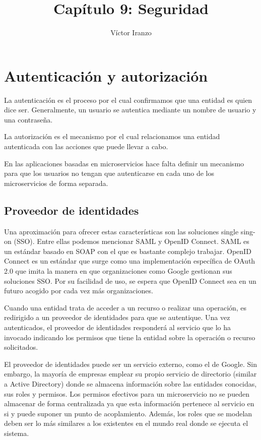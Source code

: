 \documentclass[11pt,a4paper]{article}
\author{Víctor Iranzo}
\title{Capítulo 9: Seguridad}
\begin{document}
\maketitle

\section{Autenticación y autorización}

La autenticación es el proceso por el cual confirmamos que una entidad es quien dice ser. Generalmente, un usuario se autentica mediante un nombre de usuario y una contraseña.

La autorización es el mecanismo por el cual relacionamos una entidad autenticada con las acciones que puede llevar a cabo.

En las aplicaciones basadas en microservicios hace falta definir un mecanismo para que los usuarios no tengan que autenticarse en cada uno de los microservicios de forma separada.

\subsection{Proveedor de identidades}

Una aproximación para ofrecer estas características son las soluciones single sing-on (SSO). Entre ellas podemos mencionar SAML y OpenID Connect. SAML es un estándar basado en SOAP con el que es bastante complejo trabajar. OpenID Connect es un estándar que surge como una implementación específica de OAuth 2.0 que imita la manera en que organizaciones como Google gestionan sus soluciones SSO. Por su facilidad de uso, se espera que OpenID Connect sea en un futuro acogido por cada vez más organizaciones.

Cuando una entidad trata de acceder a un recurso o realizar una operación, es redirigido a un proveedor de identidades para que se autentique. Una vez autenticados, el proveedor de identidades responderá al servicio que lo ha invocado indicando los permisos que tiene la entidad sobre la operación o recurso solicitados. 

El proveedor de identidades puede ser un servicio externo, como el de Google. Sin embargo, la mayoría de empresas emplear su propio servicio de directorio (similar a Active Directory) donde se almacena información sobre las entidades conocidas, sus roles y permisos. Los permisos efectivos para un microservicio no se pueden almacenar de forma centralizada ya que esta información pertenece al servicio en si y puede suponer un punto de acoplamiento. Además, los roles que se modelan deben ser lo más similares a los existentes en el mundo real donde se ejecuta el sistema.
\end{document}
